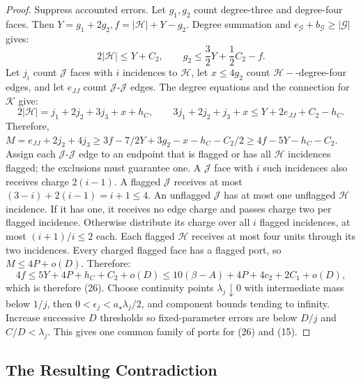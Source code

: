 \documentclass[10pt,reqno]{amsart}
\begin{document}
\begin{proof}
    Suppress accounted errors. Let $g_1, g_2$ count degree-three and degree-four faces. Then $Y = g_1 + 2g_2, f = |\mathcal{H}| + Y - g_2$. Degree summation and $e_\mathcal{G} + b_\mathcal{G} \ge |\mathcal{G}|$ gives:
    \begin{equation}
        2 | \mathcal{H} | \le Y + C_2, \qquad g_2 \le \frac{3}{2} Y + \frac{1}{2} C_2 - f.
    \end{equation}
    Let $j_i$ count $\mathcal{J}$ faces with $i$ incidences to $\mathcal{H}$, let $x \le 4 g_2$ count $\mathcal{H}-$-degree-four edges, and let $e_{JJ}$ count $\mathcal{J}$-$\mathcal{J}$ edges. The degree equations and the connection for $\mathcal{K}$ give:
    \begin{equation}
        2 | \mathcal{H}| = j_1 + 2j_2 + 3j_3 + x + h_C, \qquad 3 j_1 + 2 j_2 + j_3 + x \le Y + 2 e_{JJ} + C_2 - h_C.
    \end{equation}
    Therefore, $M = e_{JJ} + 2j_2 + 4j_3 \ge 3f - 7/2 Y + 3 g_2 - x - h_C - C_2 / 2 \ge 4f - 5Y - h_C - C_2$. Assign each $\mathcal{J}$-$\mathcal{J}$ edge to an endpoint that is flagged or has all $\mathcal{H}$ incidences flagged; the exclusions must guarantee one. A $\mathcal{J}$ face with $i$ such incidences also receives charge $2(i - 1)$. A flagged $\mathcal{J}$ receives at most $(3 - i) + 2(i - 1) = i + 1 \le 4$. An unflagged $\mathcal{J}$ has at most one unflagged $\mathcal{H}$ incidence. If it has one, it receives no edge charge and passes charge two per flagged incidence. Otherwise distribute its charge over all $i$ flagged incidences, at most $(i + 1) / i \le 2$ each. Each flagged $\mathcal{H}$ receives at most four units through its two incidences. Every charged flagged face has a flagged port, so $M \le 4P + o(D)$. Therefore:
    \begin{equation}
        4f \le 5Y + 4P + h_C + C_2 + o(D) \le 10(\beta - A) + 4P + 4c_2 + 2C_1 + o(D),
    \end{equation}
    which is therefore (26). Choose continuity points $\lambda_j \downarrow 0$ with intermediate mass below $1 / j$, then $0 < \epsilon_j < a_\star \lambda_j / 2$, and component bounds tending to infinity. Increase successive $D$ thresholds so fixed-parameter errors are below $D / j$ and $C / D < \lambda_j$. This gives one common family of ports for (26) and (15).
\end{proof}





\subsection{The Resulting Contradiction}
\end{document}

